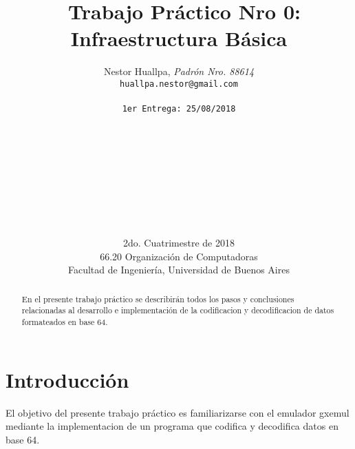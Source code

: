 \documentclass[a4paper,10pt]{article}
\title{	\ Trabajo Práctico Nro 0: Infraestructura Básica}
\author{    Nestor Huallpa, \textit{Padrón Nro. 88614}\\
            \texttt{ huallpa.nestor@gmail.com }\\\\              
            \texttt{\footnotesize 1er Entrega: 25/08/2018}\\
            \\\\\\\\\\\\\\\\\\
            \normalsize{2do. Cuatrimestre de 2018}\\ 
            \normalsize{66.20 Organización de Computadoras} \\
            \normalsize{Facultad de Ingeniería, Universidad de Buenos Aires} \\}
\date{}
\begin{document}
\maketitle
\thispagestyle{empty}
\begin{abstract}
En el presente trabajo práctico se describirán todos los pasos y 
conclusiones relacionadas al desarrollo e implementación de la codificacion y decodificacion de datos formateados en base 64.
\end{abstract}
\newpage{}
\tableofcontents
\newpage{}

\begin{flushleft}

\par\end{flushleft}
\section{{\normalsize Introducción}}

El objetivo del presente trabajo práctico es familiarizarse con el emulador gxemul mediante la implementacion de un programa que codifica y decodifica datos en base 64.




\nocite{*}
\end{document}
